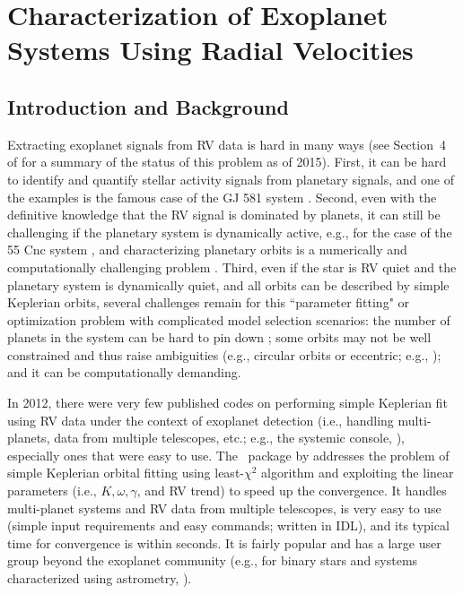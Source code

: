 \chapter{Characterization of Exoplanet Systems Using Radial
  Velocities}\label{chap:boottran}


\section{Introduction and Background}\label{boottran:sec:intro}

Extracting exoplanet signals from RV data is hard in many ways (see
Section~4 of \citealt{eprv2015} for a summary of the status of this
problem as of 2015). First, it can be hard to identify and quantify
stellar activity signals from planetary signals, and one of the
examples is the famous case of the GJ 581 system
\citep{2009A&A...507..487M, 2010ApJ...723..954V, 2013AN....334..616H,
  2014Sci...345..440R, 2015Sci...347.1080A,
  2015Sci...347.1080R}. Second, even with the definitive knowledge
that the RV signal is dominated by planets, it can still be
challenging if the planetary system is dynamically active, e.g., for
the case of the 55 Cnc system \citep{2014MNRAS.441..442N}, and
characterizing planetary orbits is a numerically and computationally
challenging problem \citep{2014ApJS..210...11N}. Third, even if the
star is RV quiet and the planetary system is dynamically quiet, and
all orbits can be described by simple Keplerian orbits, several
challenges remain for this ``parameter fitting" or optimization
problem with complicated model selection scenarios: the number of
planets in the system can be hard to pin down
\citep{2015ApJ...814...12V, 2015A&A...584A..72M, 2016arXiv160205200J};
some orbits may not be well constrained and thus raise ambiguities
(e.g., circular orbits or eccentric; e.g.,
\citealt{2010ApJ...709..168A, 2013ApJS..208....2W,
  2015A&A...577A.103K}); and it can be computationally demanding.

In 2012, there were very few published codes on performing simple
Keplerian fit using RV data under the context of exoplanet detection
(i.e., handling multi-planets, data from multiple telescopes, etc.;
e.g., the systemic console, \citealt{2009PASP..121.1016M}), especially
ones that were easy to use. The \rvlin\ package by \cite{rvlin}
addresses the problem of simple Keplerian orbital fitting using
least-$\chi^2$ algorithm and exploiting the linear parameters (i.e.,
$K, \omega, \gamma$, and RV trend) to speed up the convergence. It
handles multi-planet systems and RV data from multiple telescopes, is
very easy to use (simple input requirements and easy commands; written
in IDL), and its typical time for convergence is within seconds. It is
fairly popular and has a large user group beyond the exoplanet
community (e.g., for binary stars and systems characterized using
astrometry, \citealt{2016AJ....151...57K}).

